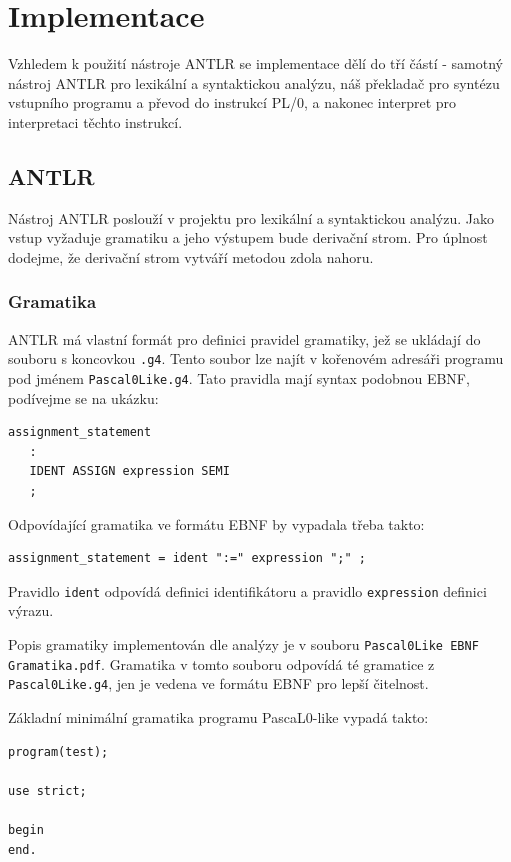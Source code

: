 \documentclass[
12pt,
a4paper,
pdftex,
czech,
titlepage
]{report}
\begin{document}
\chapter{Implementace}
 
 Vzhledem k použití nástroje ANTLR se implementace dělí do tří částí - samotný nástroj ANTLR pro lexikální a syntaktickou analýzu, náš překladač pro syntézu vstupního programu a převod do instrukcí PL/0, a nakonec interpret pro interpretaci těchto instrukcí.
 
 \section{ANTLR}
 
 Nástroj ANTLR poslouží v projektu pro lexikální a syntaktickou analýzu. Jako vstup vyžaduje gramatiku a jeho výstupem bude derivační strom. Pro úplnost dodejme, že derivační strom vytváří metodou zdola nahoru.

 
 \subsection{Gramatika} \label{gramatika}
	ANTLR má vlastní formát pro definici pravidel gramatiky, jež se ukládají do souboru s koncovkou \texttt{.g4}. Tento soubor lze najít v kořenovém adresáři programu pod jménem \texttt{Pascal0Like.g4}. Tato pravidla mají syntax podobnou EBNF, podívejme se na ukázku:
\begin{lstlisting}
assignment_statement
   :
   IDENT ASSIGN expression SEMI
   ;
\end{lstlisting}	
Odpovídající gramatika ve formátu EBNF by vypadala třeba takto:
\begin{lstlisting}
assignment_statement = ident ":=" expression ";" ;
\end{lstlisting}	

Pravidlo \texttt{ident} odpovídá definici identifikátoru a pravidlo \texttt{expression} definici výrazu.

Popis gramatiky implementován dle analýzy je v souboru \texttt{Pascal0Like EBNF Gramatika.pdf}. Gramatika v tomto souboru odpovídá té gramatice z \texttt{Pascal0Like.g4}, jen je vedena ve formátu EBNF pro lepší čitelnost.

Základní minimální gramatika programu PascaL0-like vypadá takto:
\begin{lstlisting}
program(test);

use strict;

begin
end.
\end{lstlisting}
\end{document}
